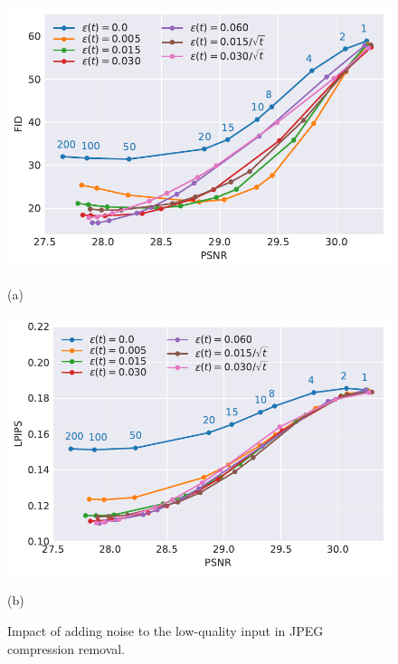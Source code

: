 \begin{figure}[t]
    \centering
    \small
    \begin{minipage}[c]{.47\textwidth}
    \centering\small
    \includegraphics[width=0.9\linewidth]{assets/pd_curve_dejpeg_q15_fid_noise.pdf}
    
    (a)
    \end{minipage}
    \begin{minipage}[c]{.47\textwidth}
    \centering\small
    \includegraphics[width=0.9\linewidth]{assets/pd_curve_dejpeg_q15_lpips_noise.pdf}
    
    (b)
    \end{minipage}
    

    \caption{Impact of adding noise to the low-quality input in JPEG compression removal.}
    \label{fig:dejpeg_noise}
\end{figure}